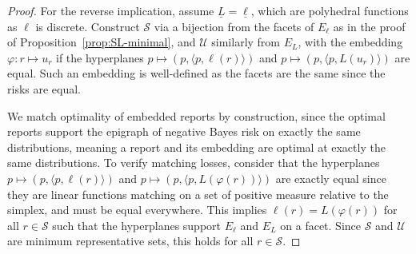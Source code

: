\documentclass[12pt]{article}
\newcommand{\Comments}{1}
\newcommand{\mynote}[2]{\ifnum\Comments=1\textcolor{#1}{#2}\fi}
\newcommand{\jessie}[1]{\mynote{teal}{[JF: #1]}}
\newcommand{\simplex}{\Delta_\Y}
\newcommand{\R}{\mathcal{R}}
\newcommand{\Sc}{\mathcal{S}}
\newcommand{\U}{\mathcal{U}}
\newcommand{\Y}{\mathcal{Y}}
\newcommand{\risk}[1]{\underline{#1}}
\newcommand{\inprod}[2]{\langle #1, #2 \rangle}%
\begin{document}
\begin{proof}
	For the reverse implication, assume $\risk{L} = \risk{\ell}$, which are polyhedral functions as $\ell$ is discrete.  
	Construct $\Sc$ via a bijection from the facets of $E_\ell$ as in the proof of Proposition~\ref{prop:SL-minimal}, and $\U$ similarly from $E_L$, with the embedding $\varphi : r \mapsto u_r$ if the hyperplanes $p \mapsto (p, \inprod{p}{\ell(r)})$ and $p \mapsto (p, \inprod{p}{L(u_r)})$ are equal.
	Such an embedding is well-defined as the facets are the same since the risks are equal.


We match optimality of embedded reports by construction, since the optimal reports support the epigraph of negative Bayes risk on exactly the same distributions, meaning a report and its embedding are optimal at exactly the same distributions.
To verify matching losses, consider that the hyperplanes $p \mapsto (p, \inprod{p}{\ell(r)})$ and $p \mapsto (p, \inprod{p}{L(\varphi(r))})$ are exactly equal since they are linear functions matching on a set of positive measure relative to the simplex, and must be equal everywhere.
This implies $\ell(r) = L(\varphi(r))$ for all $r \in \Sc$ such that the hyperplanes support $E_\ell$ and $E_L$ on a facet.
Since $\Sc$ and $\U$ are minimum representative sets, this holds for all $r \in \Sc$.
\end{proof}
\end{document}

